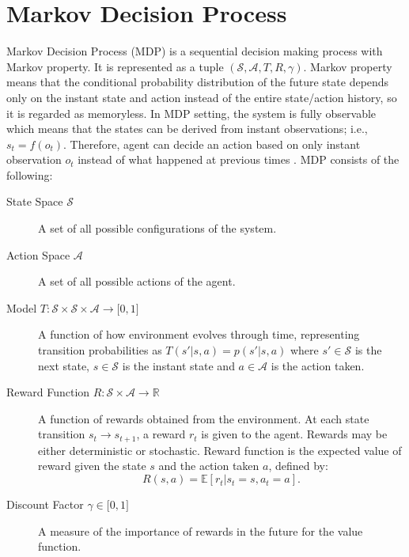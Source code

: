 \section{Markov Decision Process}
\label{sec:mdp}

Markov Decision Process (MDP) is a sequential decision making process with Markov property. 
It is represented as a tuple $(\mathcal{S},\mathcal{A},T,R,\gamma)$. 
Markov property means that the conditional probability distribution of the future state depends only on the instant state and action instead of the entire state/action history, so it is regarded as memoryless. 
In MDP setting, the system is fully observable which means that the states can be derived from instant observations; i.e., $s_t=f(o_t)$. 
Therefore, agent can decide an action based on only instant observation $o_t$ instead of what happened at previous times \cite{francois-lavet_introduction_2018}. MDP consists of the following:

\begin{description}
	\item[State Space $\mathcal{S}$] A set of all possible configurations of the system. 
	
	\item[Action Space $\mathcal{A}$]  A set of all possible actions of the agent. 
	
	\item[Model $T \colon \mathcal{S} \times \mathcal{S} \times \mathcal{A} \rightarrow \lbrack 0,1 \rbrack$] A function of how environment evolves through time, representing transition probabilities as $T(s'|s,a) = p(s'|s,a)$ 
	where $s' \in \mathcal{S}$ is the next state, $s \in \mathcal{S}$ is the instant state and $a \in \mathcal{A}$ is the action taken.
	
	\item[Reward Function $R \colon \mathcal{S} \times \mathcal{A} \rightarrow \mathbb{R}$] A function of rewards obtained from the environment. 
	At each state transition $s_t \rightarrow s_{t+1}$, a reward $r_t$ is given to the agent. 
	Rewards may be either deterministic or stochastic. 
	Reward function is the expected value of reward given the state $s$ and the action taken $a$, defined by:
	\begin{equation}
	R(s,a) = \mathbb{E}[r_t|s_t=s, a_t=a]. %
	\end{equation}
	
	\item[Discount Factor $\gamma \in \lbrack 0,1 \rbrack$] A measure of the importance of rewards in the future for the value function.
\end{description}
